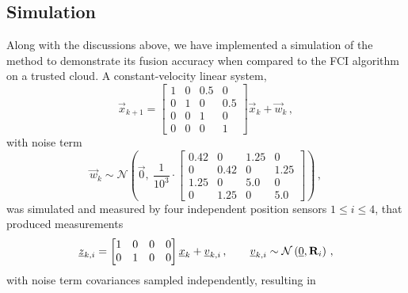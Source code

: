 \subsection{Simulation}\label{subsec:cloud_fusion:secfci_simulation}
Along with the discussions above, we have implemented a simulation of the method to demonstrate its fusion accuracy when compared to the FCI algorithm on a trusted cloud. A constant-velocity linear system, 
\begin{equation}\label{eq:cloud_fusion:secfci_system_model}
    \vec{x}_{k+1} = 
    \begin{bmatrix}
        1 & 0 & 0.5 & 0\\
        0 & 1 & 0   & 0.5\\
        0 & 0 & 1   & 0\\
        0 & 0 & 0   & 1
    \end{bmatrix}\vec{x}_k + \vec{w}_k\,,
\end{equation}
with noise term
\begin{equation}
    \vec{w}_k\sim\mathcal{N}\left(\vec{0},\ \frac{1}{10^{3}}\cdot
    \begin{bmatrix}
        0.42 & 0    & 1.25 & 0\\
        0    & 0.42 & 0    & 1.25\\
        1.25 & 0    & 5.0  & 0\\
        0    & 1.25 & 0    & 5.0
    \end{bmatrix}
    \right)\,,
\end{equation}
was simulated and measured by four independent position sensors $1\leq i\leq 4$, that produced measurements 
\begin{equation}\label{eq:cloud_fusion:secfci_measurement_model}
    {\underline{z}}_{k,i} = 
    \begin{bmatrix}
        1 & 0 & 0 & 0\\
        0 & 1 & 0 & 0
     \end{bmatrix}{\underline{x}}_k + {\underline{v}}_{k,i}\,,\qquad {\underline{v}}_{k,i}\sim\mathcal{N}\left({\underline{0}},{{\mathbf{R}}}_i\right)\,,
\end{equation}
with noise term covariances sampled independently, resulting in
